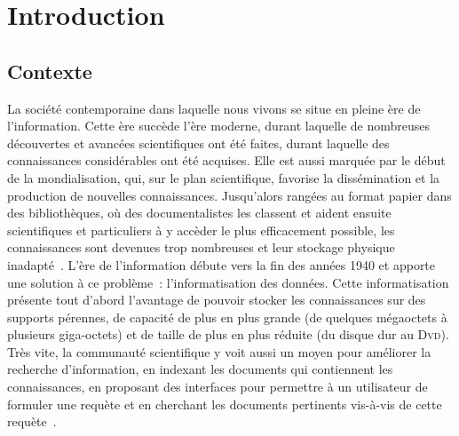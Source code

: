 \chapter{Introduction}
\label{chap:main-introduction}


  \section{Contexte}
  \label{sec:main-introduction-context}
    La société contemporaine dans laquelle nous vivons se situe en pleine ère de
    l'information. Cette ère succède l'ère moderne, durant laquelle de
    nombreuses découvertes et avancées scientifiques ont été faites, durant
    laquelle des connaissances considérables ont été acquises. Elle  est aussi
    marquée par le début de la mondialisation, qui, sur le plan scientifique,
    favorise la dissémination et la production de nouvelles connaissances.
    Jusqu'alors rangées au format papier dans des bibliothèques, où des
    documentalistes les classent et aident ensuite scientifiques et particuliers
    à y accèder le plus efficacement possible, les connaissances sont devenues
    trop nombreuses et leur stockage physique
    inadapté~\cite{rider1946thegreatdilemmaofworldorganization}. L'ère de
    l'information débute vers la fin des années 1940 et apporte une solution à
    ce problème~: l'informatisation des données. Cette informatisation présente
    tout d'abord l'avantage de pouvoir stocker les connaissances sur des
    supports pérennes, de capacité de plus en plus grande (de quelques
    mégaoctets à plusieurs giga-octets) et de taille de plus en plus réduite (du
    disque dur au \textsc{Dvd}). Très vite, la communauté scientifique y voit
    aussi un moyen pour améliorer la recherche d'information, en indexant les
    documents qui contiennent les connaissances, en proposant des interfaces
    pour permettre à un utilisateur de formuler une requète et en cherchant les
    documents pertinents vis-à-vis de cette
    requète~\cite{salton1964automaticphrasematching}.

